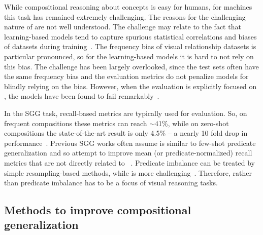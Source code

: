 While compositional reasoning about concepts is easy for humans, for machines this task has remained extremely challenging. 
The reasons for the challenging nature of \cgshort are not well understood.
The challenge may relate to the fact that learning-based models tend to capture spurious statistical correlations and biases of datasets during training~\citep{arjovsky2019invariant,niu2020counterfactual,tang2020unbiased}. 
The frequency bias of visual relationship datasets is particular pronounced, so for the learning-based models it is hard to not rely on this bias.
The \cgshort challenge has been largely overlooked, since the test sets often have the same frequency bias and the evaluation metrics do not penalize models for blindly relying on the bias. However, when the evaluation is explicitly focused on \cgshort, the models have been found to fail remarkably~\citep{atzmon2016learning, lu2016visual, tang2020unbiased, knyazev2020graph}.

In the SGG task, recall-based metrics are typically used for evaluation. So, on frequent compositions these metrics can reach $\sim$41\%, while on zero-shot compositions the state-of-the-art result is only 4.5\% -- a nearly 10 fold drop in performance~\citep{tang2020unbiased}.
Previous SGG works often assume \cgshort is similar to few-shot predicate generalization and so attempt to improve mean (or predicate-normalized) recall metrics that are not directly related to \cgshort~\citep{chen2019knowledge, dornadula2019visual,tang2019learning,zhang2019graphical,tang2020unbiased,chen2019scene,zareian2020bridging,yan2020pcpl}.  
Predicate imbalance can be treated by simple resampling-based methods, while \cgshort is more challenging~\citep{tang2020unbiased}. Therefore, \cgshort rather than predicate imbalance has to be a focus of visual reasoning tasks.


\subsection{Methods to improve compositional generalization\label{sec:bg_methods}}

